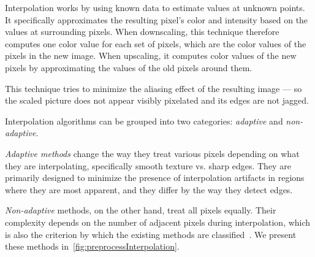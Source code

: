 Interpolation works by using known data to estimate values at unknown points. It specifically approximates the resulting pixel's color and intensity based on the values at surrounding pixels. When downscaling, this technique therefore computes one color value for each set of pixels, which are the color values of the pixels in the new image. When upscaling, it computes color values of the new pixels by approximating the values of the old pixels around them.

This technique tries to minimize the aliasing effect of the resulting image --- so the scaled picture does not appear visibly pixelated and its edges are not jagged.

Interpolation algorithms can be grouped into two categories: \emph{adaptive} and \emph{non-adaptive}.

\emph{Adaptive methods} change the way they treat various pixels depending on what they are interpolating, specifically smooth texture vs. sharp edges. They are primarily designed to minimize the presence of interpolation artifacts in regions where they are most apparent, and they differ by the way they detect edges.

\emph{Non-adaptive} methods, on the other hand, treat all pixels equally. Their complexity depends on the number of adjacent pixels during interpolation, which is also the criterion by which the existing methods are classified~\cite{interpolation}. We present these methods in~\cref{fig:preprocessInterpolation}.

